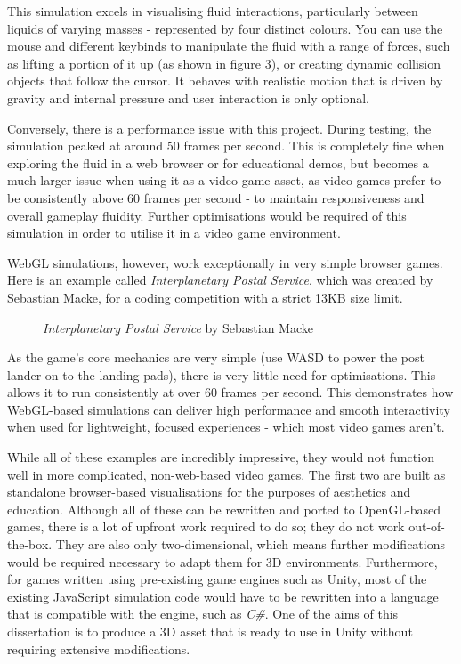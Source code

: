 \documentclass[12pt]{article}
\newcommand{\wideimage}[2][]{%
  \makebox[\textwidth][c]{\texttt{[image: \#2]}}%
}
\begin{document}
    This simulation excels in visualising fluid interactions, particularly between liquids of varying masses - represented by four distinct colours. You can use the mouse and different keybinds to manipulate the fluid with a range of forces, such as lifting a portion of it up (as shown in figure 3), or creating dynamic collision objects that follow the cursor. It behaves with realistic motion that is driven by gravity and internal pressure and user interaction is only optional.

    Conversely, there is a performance issue with this project. During testing, the simulation peaked at around 50 frames per second. This is completely fine when exploring the fluid in a web browser or for educational demos, but becomes a much larger issue when using it as a video game asset, as video games prefer to be consistently above 60 frames per second - to maintain responsiveness and overall gameplay fluidity. Further optimisations would be required of this simulation in order to utilise it in a video game environment.

    WebGL simulations, however, work exceptionally in very simple browser games. Here is an example called \textit{Interplanetary Postal Service}\cite{ips}, which was created by Sebastian Macke, for a coding competition with a strict 13KB size limit.

    \begin{figure}[H]
        \wideimage[]{webGLIPS.png}
        \caption{\textit{Interplanetary Postal Service} by Sebastian Macke \cite{ips}}
    \end{figure}

    As the game's core mechanics are very simple (use WASD to power the post lander on to the landing pads), there is very little need for optimisations. This allows it to run consistently at over 60 frames per second. This demonstrates how WebGL-based simulations can deliver high performance and smooth interactivity when used for lightweight, focused experiences - which most video games aren't.

    While all of these examples are incredibly impressive, they would not function well in more complicated, non-web-based video games. The first two are built as standalone browser-based visualisations for the purposes of aesthetics and education. Although all of these can be rewritten and ported to OpenGL-based games, there is a lot of upfront work required to do so; they do not work out-of-the-box. They are also only two-dimensional, which means further modifications would be required necessary to adapt them for 3D environments. Furthermore, for games written using pre-existing game engines such as Unity, most of the existing JavaScript simulation code would have to be rewritten into a language that is compatible with the engine, such as \textit{C\#}. One of the aims of this dissertation is to produce a 3D asset that is ready to use in Unity without requiring extensive modifications.
\end{document}
